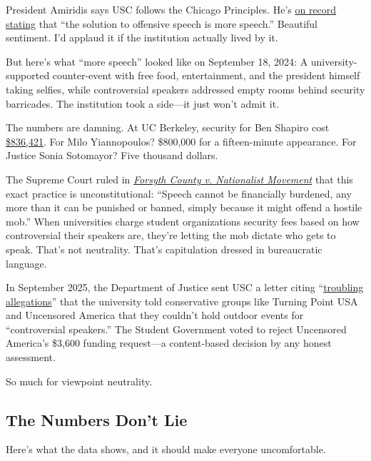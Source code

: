 \documentclass[11pt]{article}
\begin{document}
President Amiridis says USC follows the Chicago Principles. He's \href{https://sc.edu/about/our_leadership/president/presidential-communications/2024-08-27_statement_about_campus_speakers.php}{on record stating} that ``the solution to offensive speech is more speech.'' Beautiful sentiment. I'd applaud it if the institution actually lived by it.

But here's what ``more speech'' looked like on September 18, 2024: A university-supported counter-event with free food, entertainment, and the president himself taking selfies, while controversial speakers addressed empty rooms behind security barricades. The institution took a side---it just won't admit it.

The numbers are damning. At UC Berkeley, security for Ben Shapiro cost \href{https://www.berkeleyside.org/2018/02/06/uc-berkeley-spent-close-4m-security-just-one-month-2017}{\$836,421}. For Milo Yiannopoulos? \$800,000 for a fifteen-minute appearance. For Justice Sonia Sotomayor? Five thousand dollars.

The Supreme Court ruled in \href{https://supreme.justia.com/cases/federal/us/505/123/}{\textit{Forsyth County v. Nationalist Movement}} that this exact practice is unconstitutional: ``Speech cannot be financially burdened, any more than it can be punished or banned, simply because it might offend a hostile mob.'' When universities charge student organizations security fees based on how controversial their speakers are, they're letting the mob dictate who gets to speak. That's not neutrality. That's capitulation dressed in bureaucratic language.

In September 2025, the Department of Justice sent USC a letter citing ``\href{https://www.postandcourier.com/education-lab/usc-doj-charlie-kirk-outdoor-event-controversial/article_c1d6ca0b-1173-403d-bd16-6f8fec66f748.html}{troubling allegations}'' that the university told conservative groups like Turning Point USA and Uncensored America that they couldn't hold outdoor events for ``controversial speakers.'' The Student Government voted to reject Uncensored America's \$3,600 funding request---a content-based decision by any honest assessment.

So much for viewpoint neutrality.

\subsection{The Numbers Don't Lie}

Here's what the data shows, and it should make everyone uncomfortable.
\end{document}
